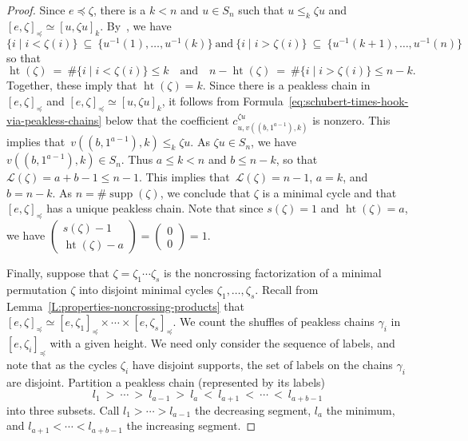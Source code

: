 \documentclass[11pt]{article}
\theoremstyle{definition}
\numberwithin{equation}{section}
\newcommand{\calL}{{\mathcal L}}
\DeclareMathOperator{\het}{ht}
\DeclareMathOperator{\supp}{supp}
\begin{document}
\begin{proof}
Since $e \preceq \zeta$, there is a $k < n$ and $u \in S_n$ such that $u \leq_k \zeta u$ and $[e, \zeta]_\preceq \simeq [u, \zeta u]_k$.
By~\cite[Thm.~3.1.5]{BS-Bruhat}, we have
\begin{equation*}
    \{i \mid i < \zeta(i)\}\ \subseteq\ \{u^{-1}(1), \ldots, u^{-1}(k)\}
    \ \text{and}\ 
    \{i \mid i > \zeta(i)\}\ \subseteq\ \{u^{-1}(k + 1), \ldots, u^{-1}(n)\}
\end{equation*}
so that
\begin{equation*}
    \het(\zeta)\ =\ \#\{i \mid i < \zeta(i)\} \leq k
    \quad\text{and}\quad
    n - \het(\zeta)\ =\ \#\{i \mid i > \zeta(i)\} \leq n - k.
\end{equation*}
Together, these imply that $\het(\zeta) = k$.
Since there is a peakless chain in $[e,\zeta]_\preceq$
and $[e,\zeta]_\preceq\simeq[u,\zeta u]_k$,
it follows from Formula~\eqref{eq:schubert-times-hook-via-peakless-chains}
below that the coefficient $c^{\zeta u}_{u, v((b,1^{a-1}),k)}$ is nonzero.
This implies that~$v((b,1^{a-1}),k)\leq_k \zeta u$.
As $\zeta u\in S_n$, we have $v((b,1^{a-1}),k)\in S_n$.
Thus $a\leq k<n$ and $b\leq n{-}k$, so that $\calL(\zeta)=a{+}b{-}1\leq n{-}1$.
This implies that~$\calL(\zeta)=n{-}1$, $a=k$, and $b=n{-}k$.
As $n=\#\supp(\zeta)$, we conclude that $\zeta$ is a minimal cycle
and that $[e, \zeta]_\preceq$ has a unique peakless chain.
Note that since $s(\zeta) = 1$ and $\het(\zeta) = a$, we have
$\left(\begin{smallmatrix} s(\zeta)-1 \\ \het(\zeta)-a \end{smallmatrix}\right)
= \left(\begin{smallmatrix} 0 \\ 0 \end{smallmatrix}\right) = 1$.

Finally, suppose that $\zeta=\zeta_1\dotsb\zeta_s$ is the noncrossing factorization of a minimal permutation $\zeta$ into disjoint minimal
cycles $\zeta_1,\dotsc,\zeta_s$.
Recall from Lemma~\ref{L:properties-noncrossing-products} that
$[e,\zeta]_\preceq \simeq  [e,\zeta_1]_\preceq \times \dotsb \times  [e,\zeta_s]_\preceq.$
We count the shuffles of peakless chains $\gamma_i$ in $[e,\zeta_i]_\preceq$ with a given height.
We need only consider the sequence of labels, and note that as the cycles $\zeta_i$ have disjoint supports, the set of labels on
the chains $\gamma_i$ are disjoint.
Partition a peakless chain (represented by its labels)
\begin{equation}\label{Eq:Peakless_Partition}
    l_1\ >\ \dotsb\ >\ l_{a-1} \ >\  l_a\ <\ l_{a+1}\ <\ \dotsb\ <\ l_{a+b-1}
\end{equation}
into three subsets.
Call $l_1> \dotsb>l_{a-1}$ the decreasing segment, $l_a$ the minimum, and
$l_{a+1} <\dotsb<l_{a+b-1}$ the increasing segment.


\end{proof}
\end{document}
